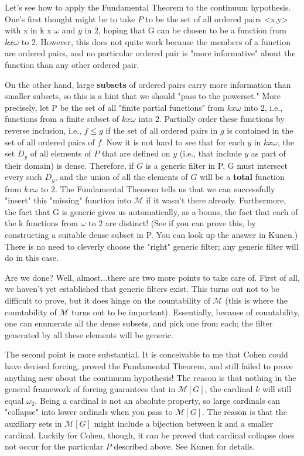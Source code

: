 \documentclass[10pt]{article}
\theoremstyle{definition}
\begin{document}
Let's see how to apply the Fundamental Theorem to the continuum hypothesis.
One's first thought might be to take $P$ to be the set of all ordered pairs
<x,y> with x in k x $\omega$ and $y$ in $2$, hoping that G can be chosen to be a
function from $k x \omega$ to $2$.  However, this does not quite work because the
members of a function are ordered pairs, and no particular ordered pair is
"more informative" about the function than any other ordered pair.

On the other hand, large \textbf{subsets} of ordered pairs carry more information
than smaller subsets, so this is a hint that we should "pass to the
powerset."  More precisely, let P be the set of all "finite partial
functions" from $k x \omega$ into $2$, i.e., functions from a finite subset of $k
x \omega$ into $2$.  Partially order these functions by reverse inclusion, i.e.,
$f \leq g$ if the set of all ordered pairs in $g$ is contained in the set of all
ordered pairs of $f$.  Now it is not hard to see that for each $y$ in $k x \omega$,
the set $D_y$ of all elements of $P$ that are defined on $y$ (i.e., that include $y$
as part of their domain) is dense.  Therefore, if $G$ is a generic filter in
P, G must intersect every such $D_y$, and the union of all the elements of $G$
will be a \textbf{total} function from $k x \omega$ to $2$.  The Fundamental Theorem
tells us that we can successfully "insert" this "missing" function into $\mathcal{M}$ if
it wasn't there already.  Furthermore, the fact that G is generic gives us
automatically, as a bonus, the fact that each of the k functions from $\omega$
to $2$ are distinct!  (See if you can prove this, by constructing a suitable
dense subset in P.  You can look up the answer in Kunen.)  There is no need
to cleverly choose the "right" generic filter; any generic filter will do
in this case.

Are we done?  Well, almost...there are two more points to take care of.
First of all, we haven't yet established that generic filters exist.
This turns out not to be difficult to prove, but it does hinge on the
countability of $\mathcal{M}$ (this is where the countability of $\mathcal{M}$ turns out to be
important).  Essentially, because of countability, one can enumerate all
the dense subsets, and pick one from each; the filter generated by all
these elements will be generic.

The second point is more substantial.  It is conceivable to me that
Cohen could have devised forcing, proved the Fundamental Theorem, and
still failed to prove anything new about the continuum hypothesis!  The
reason is that nothing in the general framework of forcing guarantees
that in $\mathcal{M}[G]$, the cardinal $k$ will still equal $\omega_2$.  Being a
cardinal is not an absolute property, so large cardinals can "collapse"
into lower ordinals when you pass to $\mathcal{M}[G]$.  The reason is that the
auxiliary sets in $\mathcal{M}[G]$ might include a bijection between k and a
smaller cardinal.  Luckily for Cohen, though, it can be proved that
cardinal collapse does not occur for the particular $P$ described above.
See Kunen for details.
\end{document}
